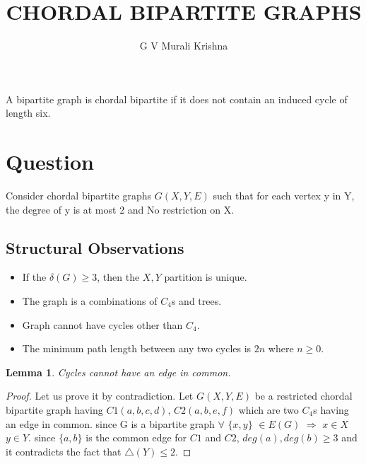 \documentclass[11pt]{article}
\title{CHORDAL BIPARTITE GRAPHS}
\author{G V Murali Krishna}
\newtheorem{lemma}{Lemma}
\begin{document}
\maketitle

A bipartite graph is chordal bipartite if it does not contain an induced cycle of length six.

\section{Question}
 Consider chordal bipartite graphs $G(X,Y,E)$ such that  for each vertex y in Y, the degree of y is at most 2 and No restriction on X.

\subsection{Structural Observations}
	\begin{itemize}
		\item If the $\delta (G) \geq 3$, then the $X,Y$ partition is unique.		
		
		\item The graph is a combinations of $C_{4}$s and trees.
		
		\item Graph cannot have cycles other than $C_{4}$.
		
		\item The minimum path length between any two cycles is $2n$ where $n \geq 0$.
		
	\end{itemize}
	\begin{lemma} \label{common vertex}
	Cycles cannot have an edge in common.
	\end{lemma}
	\begin{proof}
	Let us prove it by contradiction. Let $G(X,Y,E)$ be a restricted chordal bipartite graph having $C1(a,b,c,d)$, $C2(a,b,e,f)$ which are two $C_4$s having an edge in common. since G is a bipartite graph $\forall$ $\big \{ x,y \big \}$ $\in E(G)$ $\Longrightarrow$ $ x \in X $ $ y \in Y$. since $\big \{ a,b \big \}$ is the common edge for $C1$ and $C2$, $deg(a),deg(b) \geq 3$ and it contradicts the fact that $\triangle (Y) \leq 2$.
	\end{proof}
\end{document}
